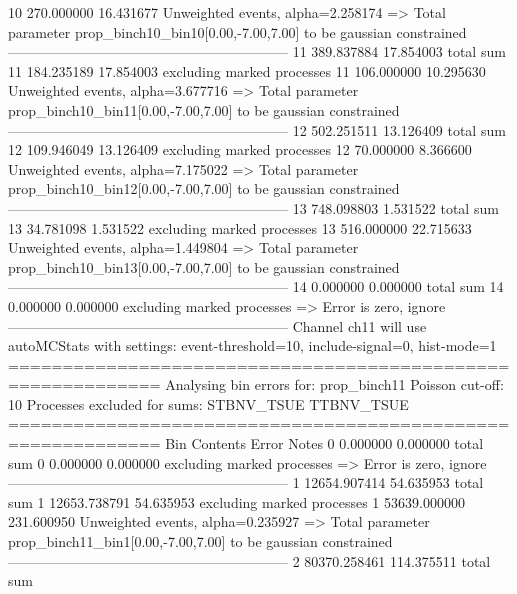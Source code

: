 10         270.000000      16.431677       Unweighted events, alpha=2.258174
  => Total parameter prop_binch10_bin10[0.00,-7.00,7.00] to be gaussian constrained
------------------------------------------------------------
11         389.837884      17.854003       total sum                     
11         184.235189      17.854003       excluding marked processes    
11         106.000000      10.295630       Unweighted events, alpha=3.677716
  => Total parameter prop_binch10_bin11[0.00,-7.00,7.00] to be gaussian constrained
------------------------------------------------------------
12         502.251511      13.126409       total sum                     
12         109.946049      13.126409       excluding marked processes    
12         70.000000       8.366600        Unweighted events, alpha=7.175022
  => Total parameter prop_binch10_bin12[0.00,-7.00,7.00] to be gaussian constrained
------------------------------------------------------------
13         748.098803      1.531522        total sum                     
13         34.781098       1.531522        excluding marked processes    
13         516.000000      22.715633       Unweighted events, alpha=1.449804
  => Total parameter prop_binch10_bin13[0.00,-7.00,7.00] to be gaussian constrained
------------------------------------------------------------
14         0.000000        0.000000        total sum                     
14         0.000000        0.000000        excluding marked processes    
  => Error is zero, ignore      
------------------------------------------------------------
Channel ch11 will use autoMCStats with settings: event-threshold=10, include-signal=0, hist-mode=1
============================================================
Analysing bin errors for: prop_binch11
Poisson cut-off: 10
Processes excluded for sums: STBNV_TSUE TTBNV_TSUE
============================================================
Bin        Contents        Error           Notes                         
0          0.000000        0.000000        total sum                     
0          0.000000        0.000000        excluding marked processes    
  => Error is zero, ignore      
------------------------------------------------------------
1          12654.907414    54.635953       total sum                     
1          12653.738791    54.635953       excluding marked processes    
1          53639.000000    231.600950      Unweighted events, alpha=0.235927
  => Total parameter prop_binch11_bin1[0.00,-7.00,7.00] to be gaussian constrained
------------------------------------------------------------
2          80370.258461    114.375511      total sum                     
